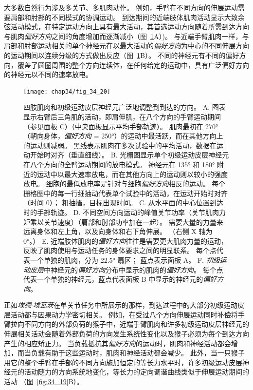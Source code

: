 大多数自然行为涉及多关节、多肌肉动作。
例如，手臂在不同方向的伸展运动需要肩部和肘部的不同模式的协调运动。
到达期间的近端肢体肌肉活动显示大致余弦活动模式，在特定运动方向上具有最大活动，其首选运动方向随着所需到达方向与肌肉\textit{偏好方向}之间的角度增加而逐渐减小（图~\ref{fig:34_20}A）)。
与近端手臂肌肉一样，与肩部和肘部运动相关的单个神经元在以最大活动的\textit{偏好方向}为中心的不同伸展方向的运动期间以连续分级的方式做出反应（图~\ref{fig:34_20}B）。
不同的神经元有不同的偏好方向，覆盖了圆圈周围的整个方向连续体，在任何给定的运动中，具有广泛偏好方向的神经元以不同的速率放电。


\begin{figure}[htbp]
	\centering
	\texttt{[image: chap34/fig\_34\_20]}
	\caption{四肢肌肉和初级运动皮层神经元广泛地调整到到达的方向。
		A. 图表显示右臂后三角肌的活动，即肩伸肌，在八个方向的手臂运动期间（参见面板 C）（中央面板显示平均手部轨迹）。
		肌肉最初在 270°（朝向身体，\textit{偏好方向} = 250°）的运动中最活跃，而在其他方向上的运动则减弱。
		黑线表示肌肉在多次试验中的平均活动，数据在运动开始时对齐（垂直细线）。
		B. 光栅图显示单个初级运动皮层神经元在八个方向的全臂运动期间的放电模式。
		神经元在 135° 和 180° 附近的运动中以最大速率放电，而在其他方向上的运动则以较小的强度放电。
		细胞的最低放电率是针对与细胞\textit{偏好方向}相反的运动。
		每个栅格图中的每一行细抽动代表单个试验中的活动，在运动开始时对齐（时间 0）；
		粗抽搐，目标出现时间\cite{georgopoulos1982relations}。
		C. 从水平面的中心位置到达时的手部轨迹。
		D. 不同空间方向运动的峰值关节功率（关节肌肉力矩乘以关节速度）（肩部和肘部功率加在一起）。
		需要大量的力量来远离身体和左上角，以及向身体和右下角伸展。 （右侧 X 轴为 0°。）
		E. 近端肢体肌肉的\textit{偏好方向}往往是需要更大肌肉力量的运动，反映了肌肉使用与运动任务的身体要求之间的明显联系。
		每个点代表一个单独的肌肉，分为 22.5° 扇区； 蓝点表示面板 A。 
		F. \textit{初级运动皮层}中神经元的\textit{偏好方向}分布中显示的肌肉的\textit{偏好方向}。
		每个点代表一个单独的神经元，蓝点代表面板 B 中显示的神经元的\textit{偏好方向}\cite{scott2001dissociation}。}
	\label{fig:34_20}
\end{figure}


正如\textit{埃德$\cdot$埃瓦茨}在单关节任务中所展示的那样，到达过程中的大部分初级运动皮层活动都与因果动力学密切相关。
例如，在受过八个方向伸展运动同时补偿将手臂拉向不同方向的外部负荷的猴子中，近端手臂肌肉和许多初级运动皮层神经元的伸展相关活动会随着外部负荷的方向发生系统性变化以及猴子必须为每个到达方向产生的相应矫正力。
当负载抵抗其\textit{偏好方向}的运动时，肌肉和神经活动都会增加，而当负载有助于这些运动时，肌肉和神经活动都会减少。
此外，当一只猴子用它的整个手臂在手部的不同方向施加恒定的等长力水平时，许多初级运动皮层神经元的活动随力的方向系统地变化，等长力的定向调谐曲线类似于伸展运动期间的活动 （图~\ref{fig:34_19}B）。


